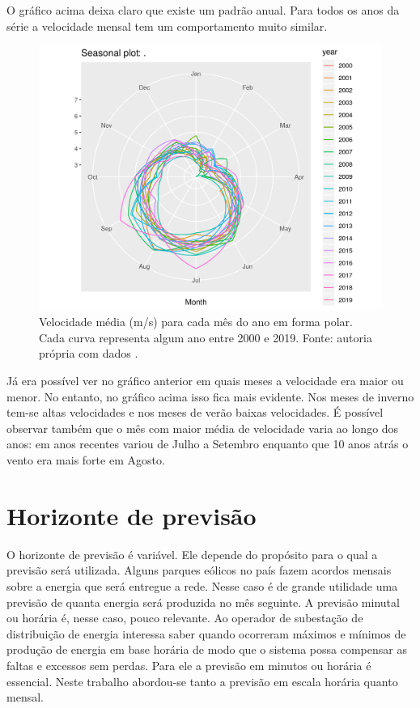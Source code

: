 \documentclass[
	12pt,				%
	openright,			%
	oneside,			%
	a4paper,			%
	english,			%
	french,				%
	spanish,			%
	brazil				%
	]{abntex2}
\begin{document}
O gráfico acima deixa claro que existe um padrão anual. Para todos os anos da série a velocidade mensal tem um comportamento muito similar.

\begin{figure}[h]
    \centering
	\includegraphics[width=\textwidth]{season_plot_polar}
	\caption{Velocidade média (m/s) para cada mês do ano em forma polar. Cada curva representa algum ano entre 2000 e 2019. Fonte: autoria própria com dados \cite{era5}.}
\end{figure}
\FloatBarrier

Já era possível ver no gráfico anterior em quais meses a velocidade era maior ou menor. No entanto, no gráfico acima isso fica mais evidente. Nos meses de inverno tem-se altas velocidades e nos meses de verão baixas velocidades. É possível observar também que o mês com maior média de velocidade varia ao longo dos anos: em anos recentes variou de Julho a Setembro enquanto que 10 anos atrás o vento era mais forte em Agosto.

\section{Horizonte de previsão}

O horizonte de previsão é variável. Ele depende do propósito para o qual a previsão será utilizada. Alguns parques eólicos no país fazem acordos mensais sobre a energia que será entregue a rede. Nesse caso é de grande utilidade uma previsão de quanta energia será produzida no mês seguinte. A previsão minutal ou horária é, nesse caso, pouco relevante.
Ao operador de subestação de distribuição de energia interessa saber quando ocorreram máximos e mínimos de produção de energia em base horária de modo que o sistema possa compensar as faltas e excessos sem perdas. Para ele a previsão em minutos ou horária é essencial. Neste trabalho abordou-se tanto a previsão em escala horária quanto mensal.
\end{document}
